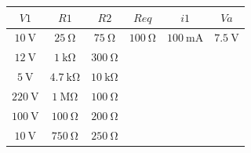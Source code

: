 \documentclass{article}
\begin{document}
\begin{enumerate}[label=\textbf{A.\arabic*}]
\begin{minipage}{.60\textwidth}
			\begin{tabular}{|c|c|c|c|c|c|}
				\hline
				\rowcolor{headergray}
				${V1}$&$ {R1}$ &${R2}$ &$ {Req}$ &$ {i1}$  &$ {Va}$\\ \hline
				$\SI{10}{\volt}$& $\SI{25}{\ohm}$& $\SI{75}{\ohm}$& $\SI{100}{\ohm}$ & $\SI{100}{\milli\ampere}$ & $\SI{7,5}{\volt}$ \\ \hline
				$\SI{12}{\volt}$& $\SI{1}{\kilo\ohm}$& $\SI{300}{\ohm}$& && \\ \hline
				$\SI{5}{\volt}$& $\SI{4,7}{\kilo\ohm}$& $\SI{10}{\kilo\ohm}$& && \\ \hline
				$\SI{220}{\volt}$& $\SI{1}{\mega\ohm}$& $\SI{100}{\ohm}$& && \\ \hline
				$\SI{100}{\volt}$& $\SI{100}{\ohm}$& $\SI{200}{\ohm}$& && \\ \hline
				$\SI{10}{\volt}$& $\SI{750}{\ohm}$& $\SI{250}{\ohm}$& && \\ \hline
			

\end{tabular}
\end{minipage}
\end{enumerate}
\end{document}
